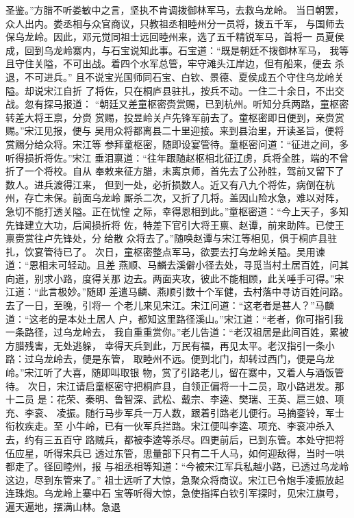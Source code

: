 圣鉴。”方腊不听娄敏中之言，坚执不肯调拨御林军马，去救乌龙岭。
当日朝罢，众人出内。娄丞相与众官商议，只教祖丞相睦州分一员将，拨五千军，
与国师去保乌龙岭。因此，邓元觉同祖士远回睦州来，选了五千精锐军马，首将一
员夏侯成，回到乌龙岭寨内，与石宝说知此事。石宝道：“既是朝廷不拨御林军马，
我等且守住关隘，不可出战。着四个水军总管，牢守滩头江岸边，但有船来，便去
杀退，不可进兵。”
且不说宝光国师同石宝、白钦、景德、夏侯成五个守住乌龙岭关隘。却说宋江自折
了将佐，只在桐庐县驻扎，按兵不动。一住二十余日，不出交战。忽有探马报道：
“朝廷又差童枢密赍赏赐，已到杭州。听知分兵两路，童枢密转差大将王禀，分赍
赏赐，投昱岭关卢先锋军前去了。童枢密即日便到，亲赍赏赐。”宋江见报，便与
吴用众将都离县二十里迎接。来到县治里，开读圣旨，便将赏赐分给众将。宋江等
参拜童枢密，随即设宴管待。童枢密问道：“征进之间，多听得损折将佐。”宋江
垂泪禀道：“往年跟随赵枢相北征辽虏，兵将全胜，端的不曾折了一个将校。自从
奉敕来征方腊，未离京师，首先去了公孙胜，驾前又留下了数人。进兵渡得江来，
但到一处，必折损数人。近又有八九个将佐，病倒在杭州，存亡未保。前面乌龙岭
厮杀二次，又折了几将。盖因山险水急，难以对阵，急切不能打透关隘。正在忧惶
之际，幸得恩相到此。”童枢密道：“今上天子，多知先锋建立大功，后闻损折将
佐，特差下官引大将王禀、赵谭，前来助阵。已使王禀赍赏往卢先锋处，分给散
众将去了。”随唤赵谭与宋江等相见，俱于桐庐县驻扎，饮宴管待已了。
次日，童枢密整点军马，欲要去打乌龙岭关隘。吴用谏道：“恩相未可轻动。且差
燕顺、马麟去溪僻小径去处，寻觅当村土居百姓，问其向道，别求小路，度得关那
边去。两面夹攻，彼此不能相顾，此关唾手可得。”宋江道：“此言极妙。”随即
差遣马麟、燕顺引数十个军健，去村落中寻访百姓问路。去了一日，至晚，引将一
个老儿来见宋江。宋江问道：“这老者是甚人？”马麟道：“这老的是本处土居人
户，都知这里路径溪山。”宋江道：“老者，你可指引我一条路径，过乌龙岭去，
我自重重赏你。”老儿告道：“老汉祖居是此间百姓，累被方腊残害，无处逃躲，
幸得天兵到此，万民有福，再见太平。老汉指引一条小路：过乌龙岭去，便是东管，
取睦州不远。便到北门，却转过西门，便是乌龙岭。”宋江听了大喜，随即叫取银
物，赏了引路老儿，留在寨中，又着人与酒饭管待。
次日，宋江请启童枢密守把桐庐县，自领正偏将一十二员，取小路进发。那十二员
是：花荣、秦明、鲁智深、武松、戴宗、李逵、樊瑞、王英、扈三娘、项充、李衮、
凌振。随行马步军兵一万人数，跟着引路老儿便行。马摘銮铃，军士衔枚疾走。至
小牛岭，已有一伙军兵拦路。宋江便叫李逵、项充、李衮冲杀入去，约有三五百守
路贼兵，都被李逵等杀尽。四更前后，已到东管。本处守把将伍应星，听得宋兵已
透过东管，思量部下只有二千人马，如何迎敌得，当时一哄都走了。径回睦州，报
与祖丞相等知道：“今被宋江军兵私越小路，已透过乌龙岭这边，尽到东管来了。”
祖士远听了大惊，急聚众将商议。宋江已令炮手凌振放起连珠炮。乌龙岭上寨中石
宝等听得大惊，急使指挥白钦引军探时，见宋江旗号，遍天遍地，摆满山林。急退
